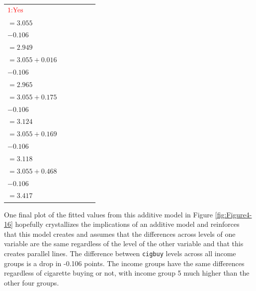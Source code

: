 \documentclass[]{book}
\theoremstyle{definition}
\theoremstyle{definition}
\theoremstyle{remark}
\begin{document}
\begin{longtable}[]{@{}llllll@{}}
\begin{minipage}[t]{0.12\columnwidth}
\(\color{red}{\text{1:}\text{Yes}}\)\strut
\end{minipage} & \begin{minipage}[t]{0.12\columnwidth}\raggedright\strut
\(\hat{\alpha}+\hat{\gamma}_2\)\\
\(=3.055\)\\
\(-0.106\)\\
\(=2.949\)\strut
\end{minipage} & \begin{minipage}[t]{0.15\columnwidth}\raggedright\strut
\(\hat{\alpha}+\hat{\tau}_2+\hat{\gamma}_2\)\\
\(=3.055+0.016\)\\
\(-0.106\)\\
\(=2.965\)\strut
\end{minipage} & \begin{minipage}[t]{0.15\columnwidth}\raggedright\strut
\(\hat{\alpha}+\hat{\tau}_3+\hat{\gamma}_2\)\\
\(=3.055+0.175\)\\
\(-0.106\)\\
\(=3.124\)\strut
\end{minipage} & \begin{minipage}[t]{0.15\columnwidth}\raggedright\strut
\(\hat{\alpha}+\hat{\tau}_4+\hat{\gamma}_2\)\\
\(=3.055+0.169\)\\
\(-0.106\)\\
\(=3.118\)\strut
\end{minipage} & \begin{minipage}[t]{0.15\columnwidth}\raggedright\strut
\(\hat{\alpha}+\hat{\tau}_5+\hat{\gamma}_2\)\\
\(=3.055+0.468\)\\
\(-0.106\)\\
\(=3.417\)\strut
\end{minipage}\tabularnewline
\bottomrule
\end{longtable}

\normalsize

One final plot of the fitted values from this additive model in Figure
\ref{fig:Figure4-16} hopefully crystallizes the implications of an
additive model and reinforces that this model creates and assumes that
the differences across levels of one variable are the same regardless of
the level of the other variable and that this creates parallel lines.
The difference between \texttt{cigbuy} levels across all income groups
is a drop in -0.106 points. The income groups have the same differences
regardless of cigarette buying or not, with income group 5 much higher
than the other four groups.
\end{document}
